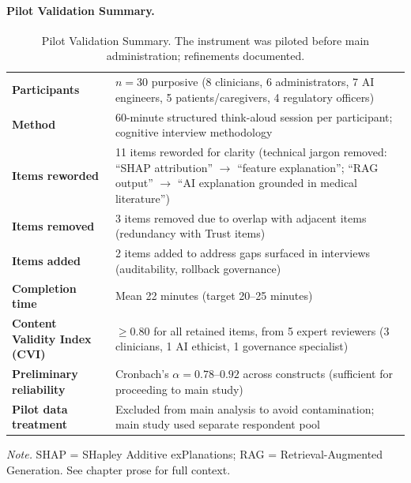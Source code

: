 \paragraph{Pilot Validation Summary.}




{\tablestripes\tablefontsize
{}
\begin{xltabular}{\textwidth}{@{} >{\raggedright\arraybackslash}p{3.0cm} L @{}}
\caption[Pilot Validation Summary]{Pilot Validation Summary. The instrument was piloted before main administration; refinements documented.}\label{tab:survey_pilot_summary} \\
\toprule
{} &  \\
\midrule
\endfirsthead
\endhead
\bottomrule
\endlastfoot
\textbf{Participants}                & $n = 30$ purposive (8 clinicians, 6 administrators, 7 AI engineers, 5 patients/caregivers, 4 regulatory officers) \\
\textbf{Method}                      & 60-minute structured think-aloud session per participant; cognitive interview methodology \\
\textbf{Items reworded}              & 11 items reworded for clarity (technical jargon removed: ``SHAP attribution'' $\to$ ``feature explanation''; ``RAG output'' $\to$ ``AI explanation grounded in medical literature'') \\
\textbf{Items removed}               & 3 items removed due to overlap with adjacent items (redundancy with Trust items) \\
\textbf{Items added}                 & 2 items added to address gaps surfaced in interviews (auditability, rollback governance) \\
\textbf{Completion time}             & Mean 22 minutes (target 20--25 minutes) \\
\textbf{Content Validity Index (CVI)}& $\geq 0.80$ for all retained items, from 5 expert reviewers (3 clinicians, 1 AI ethicist, 1 governance specialist) \\
\textbf{Preliminary reliability}     & Cronbach's $\alpha = 0.78$--$0.92$ across constructs (sufficient for proceeding to main study) \\
\textbf{Pilot data treatment}        & Excluded from main analysis to avoid contamination; main study used separate respondent pool \\
\end{xltabular}}
\vspace{0.3em}\noindent\textit{Note.} SHAP = SHapley Additive exPlanations; RAG = Retrieval-Augmented Generation. See chapter prose for full context.

